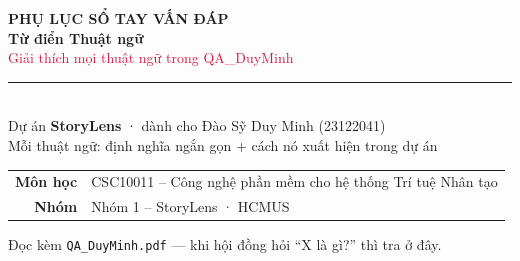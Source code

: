 \documentclass[11pt]{article}
\begin{document}
\begin{titlepage}
\centering
\vspace*{2.4cm}
{\headfont\bfseries\fontsize{15}{18}\selectfont\textcolor{soft}{PHỤ LỤC SỔ TAY VẤN ĐÁP}}\\[6pt]
{\headfont\bfseries\fontsize{38}{42}\selectfont\textcolor{ink}{Từ điển Thuật ngữ}}\\[8pt]
{\large\headfont\textcolor{crimson}{Giải thích mọi thuật ngữ trong QA\_DuyMinh}}\\[10pt]
{\color{crimson}\rule{9cm}{2pt}}\\[10pt]
{\large Dự án \textbf{StoryLens} · dành cho Đào Sỹ Duy Minh (23122041)}\\[4pt]
{\color{soft}\large Mỗi thuật ngữ: định nghĩa ngắn gọn + cách nó xuất hiện trong dự án}\\[2.2cm]
\begin{tabular}{rl}
\textbf{Môn học} & CSC10011 -- Công nghệ phần mềm cho hệ thống Trí tuệ Nhân tạo\\[3pt]
\textbf{Nhóm} & Nhóm 1 -- StoryLens · HCMUS\\
\end{tabular}
\vfill
{\color{soft}\small Đọc kèm \texttt{QA\_DuyMinh.pdf} --- khi hội đồng hỏi ``X là gì?'' thì tra ở đây.}
\end{titlepage}

\tableofcontents
\newpage

\end{document}

